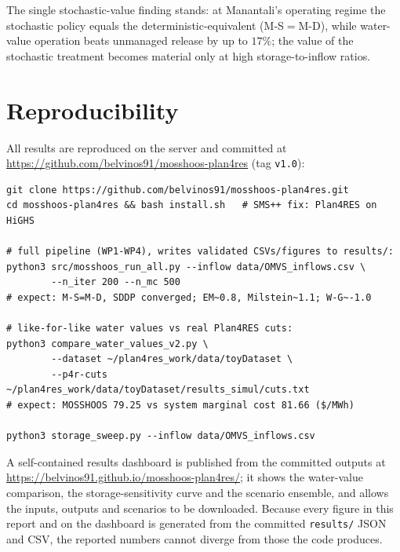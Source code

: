 \documentclass[12pt,a4paper]{article}
\begin{document}
The single stochastic-value finding stands: at Manantali's operating regime the
stochastic policy equals the deterministic-equivalent (M-S$=$M-D), while
water-value operation beats unmanaged release by up to $17\%$; the value of the
stochastic treatment becomes material only at high storage-to-inflow ratios.

\section{Reproducibility}

All results are reproduced on the server and committed at
\url{https://github.com/belvinos91/mosshoos-plan4res} (tag \texttt{v1.0}):

\begin{lstlisting}
git clone https://github.com/belvinos91/mosshoos-plan4res.git
cd mosshoos-plan4res && bash install.sh   # SMS++ fix: Plan4RES on HiGHS

# full pipeline (WP1-WP4), writes validated CSVs/figures to results/:
python3 src/mosshoos_run_all.py --inflow data/OMVS_inflows.csv \
        --n_iter 200 --n_mc 500
# expect: M-S=M-D, SDDP converged; EM~0.8, Milstein~1.1; W-G~-1.0

# like-for-like water values vs real Plan4RES cuts:
python3 compare_water_values_v2.py \
        --dataset ~/plan4res_work/data/toyDataset \
        --p4r-cuts ~/plan4res_work/data/toyDataset/results_simul/cuts.txt
# expect: MOSSHOOS 79.25 vs system marginal cost 81.66 ($/MWh)

python3 storage_sweep.py --inflow data/OMVS_inflows.csv
\end{lstlisting}

A self-contained results dashboard is published from the committed outputs at
\url{https://belvinos91.github.io/mosshoos-plan4res/}; it shows the water-value
comparison, the storage-sensitivity curve and the scenario ensemble, and allows
the inputs, outputs and scenarios to be downloaded. Because every figure in this
report and on the dashboard is generated from the committed \texttt{results/}
JSON and CSV, the reported numbers cannot diverge from those the code produces.



\end{document}
